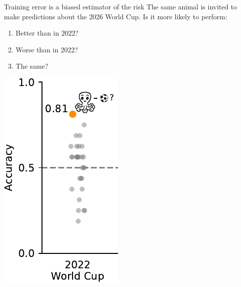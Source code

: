 \documentclass[presentation,mathserif,table]{beamer}
\begin{document}
\begin{frame}[label={sec:org87fe0f2}]{Training error is a biased estimator of the risk}
The same animal is invited to make predictions about the 2026 World Cup.
Is it more likely to perform:
\begin{enumerate}
\item Better than in 2022?
\item Worse than in 2022?
\item The same?
\end{enumerate}
\begin{center}
\includegraphics[height=.65 \textheight]{figures/generated/select_evaluate/select_evaluate_2b.pdf}
\end{center}
\end{frame}
\end{document}
